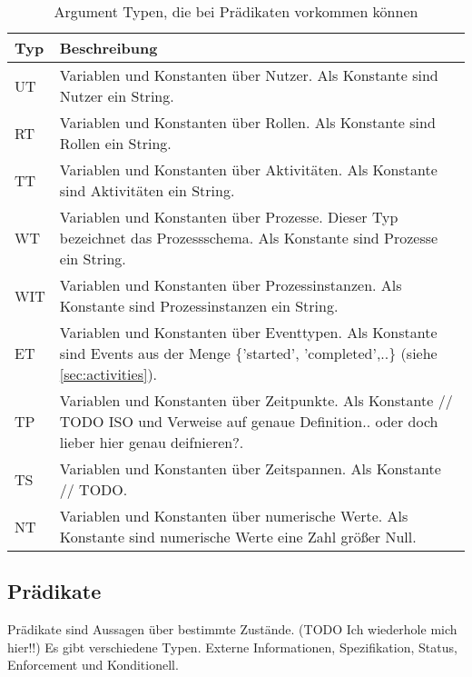 \begin{table}[h]
\begin{tabular} {|p{2cm}|p{13cm}|}
\hline
\textbf{Typ}&\textbf{Beschreibung}\\
\hline
UT& Variablen und Konstanten über Nutzer. Als Konstante sind Nutzer ein String.\\
\hline
RT& Variablen und Konstanten über Rollen. Als Konstante sind Rollen ein String.\\
\hline
TT& Variablen und Konstanten über Aktivitäten. Als Konstante sind Aktivitäten ein String.\\
\hline
WT& Variablen und Konstanten über Prozesse. Dieser Typ bezeichnet das Prozessschema. Als Konstante sind Prozesse ein String.\\
\hline
WIT& Variablen und Konstanten über Prozessinstanzen. Als Konstante sind Prozessinstanzen ein String.\\
\hline
ET&  Variablen und Konstanten über Eventtypen. Als Konstante sind Events aus der Menge $\{$'started', 'completed',..$\}$ (siehe \ref{sec:activities}).\\
\hline
TP& Variablen und Konstanten über Zeitpunkte. Als Konstante // TODO ISO und Verweise auf genaue Definition.. oder doch lieber hier genau deifnieren?.\\
\hline
TS& Variablen und Konstanten über Zeitspannen. Als Konstante // TODO.\\
\hline
NT&  Variablen und Konstanten über numerische Werte. Als Konstante sind numerische Werte eine Zahl größer Null.\\
\hline
\end{tabular}
\caption{Argument Typen, die bei Prädikaten vorkommen können}
\label{tab:args}
\end{table}

\subsection{Prädikate}
Prädikate sind Aussagen über bestimmte Zustände. (TODO Ich wiederhole mich hier!!) Es gibt verschiedene Typen. Externe Informationen, Spezifikation, Status, Enforcement und Konditionell. \\

